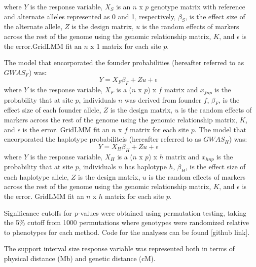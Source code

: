 \documentclass[article,9pt,twocolumn,twoside]{rilabRxiv}
\begin{document}
where $Y$ is the response variable, $X_S$ is an $n$ x $p$ genotype matrix with reference and alternate alleles represented as 0 and 1, respectively, $\beta_S$, is the effect size of the alternate allele, $Z$ is the design matrix, $u$ is the random effects of markers across the rest of the genome using the genomic relationship matrix, $K$, and $\epsilon$ is the error.GridLMM fit an $n$ x 1 matrix for each site $p$.

The model that encorporated the founder probabilities (hereafter referred to as $GWAS_F$) was:
\begin{equation}
\label{eqn:gridlmm2}
 Y = X_F{\beta_F} + Zu + \epsilon
\end{equation}
where $Y$ is the response variable, $X_F$ is a ($n$ x $p$) x $f$ matrix and $x_{fnp}$ is the probability that at site $p$, individuals $n$ was derived from founder $f$, $\beta_F$, is the effect size of each founder allele, $Z$ is the design matrix, $u$ is the random effects of markers across the rest of the genome using the genomic relationship matrix, $K$, and $\epsilon$ is the error. GridLMM fit an $n$ x $f$ matrix for each site $p$.
The model that encorporated the haplotype probabiliteis (hereafter referred to as $GWAS_H$) was:
\begin{equation}
\label{eqn:gridlmm3}
 Y = X_H{\beta_H} + Zu + \epsilon
\end{equation}
where $Y$ is the response variable, $X_H$ is a ($n$ x $p$) x $h$ matrix and $x_{hnp}$ is the probability that at site $p$, individuals $n$ has haplotype $h$, $\beta_H$, is the effect size of each haplotype allele, $Z$ is the design matrix, $u$ is the random effects of markers across the rest of the genome using the genomic relationship matrix, $K$, and $\epsilon$ is the error. GridLMM fit an $n$ x $h$ matrix for each site $p$.

 Significance cutoffs for p-values were obtained using permutation testing, taking the 5\% cutoff from 1000 permutations where genotypes were randomized relative to phenotypes for each method. Code for the analyses can be found [github link].


The support interval size response variable was represented both in terms of physical distance (Mb) and genetic distance (cM).
\end{document}

